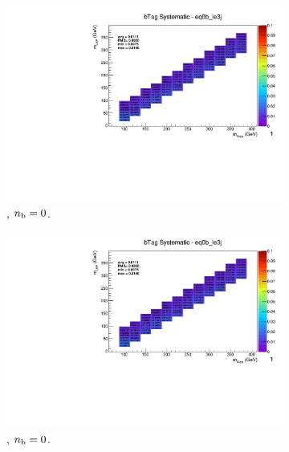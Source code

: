 \begin{figure}[ht!]
  \centering
  \begin{subfigure}[b]{0.32\textwidth}
    \includegraphics[width=\textwidth, page=12]{Figs/sms/t2degen/v19_2/systs/T2_4body_bTag_eq0b_le3j.pdf}
    \caption{\njlow, $n_{\text{b}} = 0$.}
  \end{subfigure}
  \begin{subfigure}[b]{0.32\textwidth}
    \includegraphics[width=\textwidth, page=8]{Figs/sms/t2degen/v19_2/systs/T2_4body_bTag_eq0b_le3j.pdf}
    \caption{\njlow, $n_{\text{b}} = 0$.}
  \end{subfigure}
  \begin{subfigure}[b]{0.32\textwidth}

\end{subfigure}
\end{figure}
